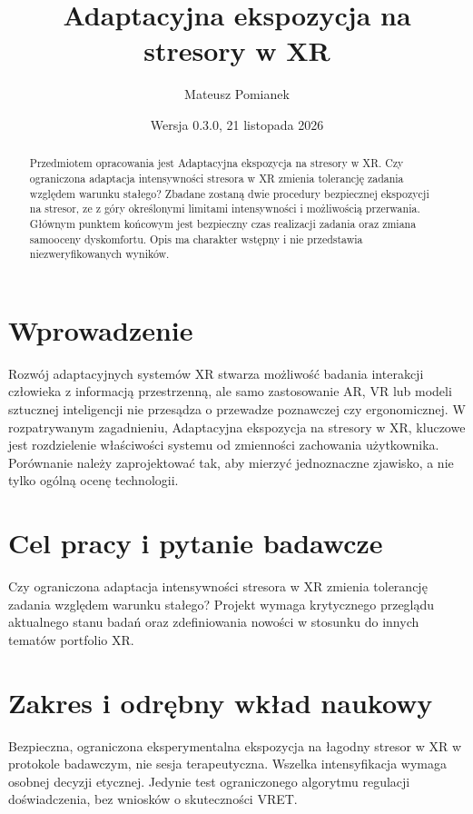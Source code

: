 \documentclass[11pt,a4paper]{article}
\title{Adaptacyjna ekspozycja na stresory w XR}
\author{Mateusz Pomianek}
\date{Wersja 0.3.0, 21 listopada 2026}
\begin{document}
\maketitle

\begin{abstract}

Przedmiotem opracowania jest Adaptacyjna ekspozycja na stresory w XR. Czy ograniczona adaptacja intensywności stresora w XR zmienia tolerancję zadania względem warunku stałego? Zbadane zostaną dwie procedury bezpiecznej ekspozycji na stresor, ze z góry określonymi limitami intensywności i możliwością przerwania. Głównym punktem końcowym jest bezpieczny czas realizacji zadania oraz zmiana samooceny dyskomfortu. Opis ma charakter wstępny i nie przedstawia niezweryfikowanych wyników.

\end{abstract}

\section{Wprowadzenie}

Rozwój adaptacyjnych systemów XR stwarza możliwość badania interakcji człowieka z informacją przestrzenną, ale samo zastosowanie AR, VR lub modeli sztucznej inteligencji nie przesądza o przewadze poznawczej czy ergonomicznej. W rozpatrywanym zagadnieniu, Adaptacyjna ekspozycja na stresory w XR, kluczowe jest rozdzielenie właściwości systemu od zmienności zachowania użytkownika. Porównanie należy zaprojektować tak, aby mierzyć jednoznaczne zjawisko, a nie tylko ogólną ocenę technologii.

\section{Cel pracy i pytanie badawcze}

Czy ograniczona adaptacja intensywności stresora w XR zmienia tolerancję zadania względem warunku stałego? Projekt wymaga krytycznego przeglądu aktualnego stanu badań oraz zdefiniowania nowości w stosunku do innych tematów portfolio XR.

\section{Zakres i odrębny wkład naukowy}
Bezpieczna, ograniczona eksperymentalna ekspozycja na łagodny stresor w XR w protokole badawczym, nie sesja terapeutyczna. Wszelka intensyfikacja wymaga osobnej decyzji etycznej. Jedynie test ograniczonego algorytmu regulacji doświadczenia, bez wniosków o skuteczności VRET.
\end{document}
